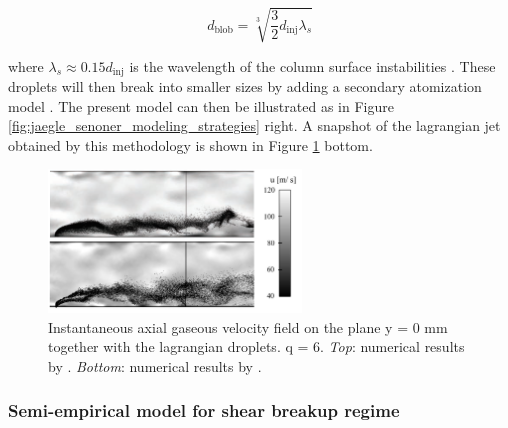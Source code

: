 \begin{equation}
d_\mathrm{blob} = \sqrt[3]{\frac{3}{2} d_\mathrm{inj} \lambda_s}
\end{equation}

where $\lambda_s \approx 0.15 d_\mathrm{inj}$ is the wavelength of the column surface instabilities . These droplets will then break into smaller sizes by adding a secondary atomization model . The present model can then be illustrated as in Figure \ref{fig:jaegle_senoner_modeling_strategies} right. A snapshot of the lagrangian jet obtained by this methodology is shown in Figure \ref{fig:jaegle_senoner_lagrangian_fields} bottom.


\begin{figure}[ht]
    \centering
    \includegraphics[width=0.6\textwidth]{./part1_numerical_approaches/figures_ch3/jaegle_senoner_lagrangian_fields}
       \centering
    \caption[Instantaneous axial gaseous velocity field on the plane y = 0 mm together with the lagrangian
droplets.]{Instantaneous axial gaseous velocity field on the plane y = 0 mm together with the lagrangian
droplets. q = 6. \textsl{Top}: numerical results by . \textsl{Bottom}: numerical results by .}
    \label{fig:jaegle_senoner_lagrangian_fields}
\end{figure}

\subsubsection*{Semi-empirical model for shear breakup regime }

